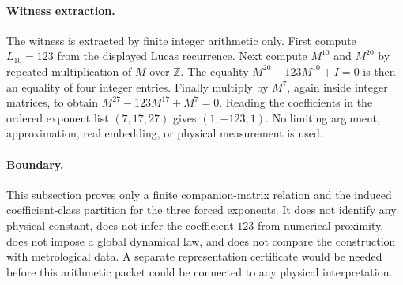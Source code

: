 \paragraph{Witness extraction.}
The witness is extracted by finite integer arithmetic only. First compute $L_{10}=123$ from the displayed Lucas recurrence. Next compute $M^{10}$ and $M^{20}$ by repeated multiplication of $M$ over $\mathbb{Z}$. The equality $M^{20}-123M^{10}+I=0$ is then an equality of four integer entries. Finally multiply by $M^7$, again inside integer matrices, to obtain $M^{27}-123M^{17}+M^7=0$. Reading the coefficients in the ordered exponent list $(7,17,27)$ gives $(1,-123,1)$. No limiting argument, approximation, real embedding, or physical measurement is used.

\paragraph{Boundary.}
This subsection proves only a finite companion-matrix relation and the induced coefficient-class partition for the three forced exponents. It does not identify any physical constant, does not infer the coefficient $123$ from numerical proximity, does not impose a global dynamical law, and does not compare the construction with metrological data. A separate representation certificate would be needed before this arithmetic packet could be connected to any physical interpretation.
